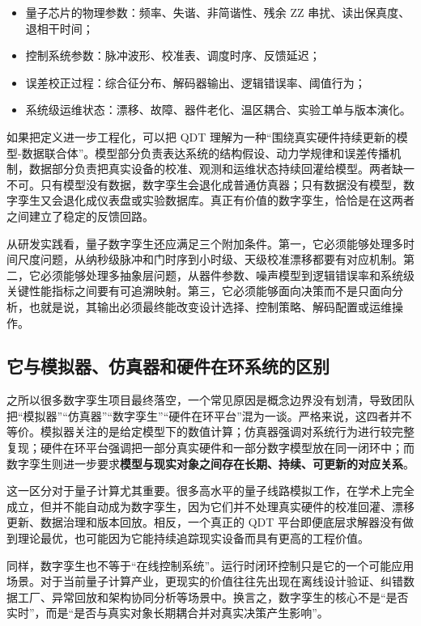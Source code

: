 \documentclass[11pt,a4paper]{article}
\newcommand{\QDT}{QDT}
\begin{document}
\begin{itemize}
  \item 量子芯片的物理参数：频率、失谐、非简谐性、残余 ZZ 串扰、读出保真度、退相干时间；
  \item 控制系统参数：脉冲波形、校准表、调度时序、反馈延迟；
  \item 误差校正过程：综合征分布、解码器输出、逻辑错误率、阈值行为；
  \item 系统级运维状态：漂移、故障、器件老化、温区耦合、实验工单与版本演化。
\end{itemize}

如果把定义进一步工程化，可以把 \QDT{} 理解为一种“围绕真实硬件持续更新的模型-数据联合体”。模型部分负责表达系统的结构假设、动力学规律和误差传播机制，数据部分负责把真实设备的校准、观测和运维状态持续回灌给模型。两者缺一不可。只有模型没有数据，数字孪生会退化成普通仿真器；只有数据没有模型，数字孪生又会退化成仪表盘或实验数据库。真正有价值的数字孪生，恰恰是在这两者之间建立了稳定的反馈回路。

从研发实践看，量子数字孪生还应满足三个附加条件。第一，它必须能够处理多时间尺度问题，从纳秒级脉冲和门时序到小时级、天级校准漂移都要有对应机制。第二，它必须能够处理多抽象层问题，从器件参数、噪声模型到逻辑错误率和系统级关键性能指标之间要有可追溯映射。第三，它必须能够面向决策而不是只面向分析，也就是说，其输出必须最终能改变设计选择、控制策略、解码配置或运维操作。

\subsection{它与模拟器、仿真器和硬件在环系统的区别}

之所以很多数字孪生项目最终落空，一个常见原因是概念边界没有划清，导致团队把“模拟器”“仿真器”“数字孪生”“硬件在环平台”混为一谈。严格来说，这四者并不等价。模拟器关注的是给定模型下的数值计算；仿真器强调对系统行为进行较完整复现；硬件在环平台强调把一部分真实硬件和一部分数字模型放在同一闭环中；而数字孪生则进一步要求\textbf{模型与现实对象之间存在长期、持续、可更新的对应关系}。

这一区分对于量子计算尤其重要。很多高水平的量子线路模拟工作，在学术上完全成立，但并不能自动成为数字孪生，因为它们并不处理真实硬件的校准回灌、漂移更新、数据治理和版本回放。相反，一个真正的 \QDT{} 平台即便底层求解器没有做到理论最优，也可能因为它能持续追踪现实设备而具有更高的工程价值。

同样，数字孪生也不等于“在线控制系统”。运行时闭环控制只是它的一个可能应用场景。对于当前量子计算产业，更现实的价值往往先出现在离线设计验证、纠错数据工厂、异常回放和架构协同分析等场景中。换言之，数字孪生的核心不是“是否实时”，而是“是否与真实对象长期耦合并对真实决策产生影响”。
\end{document}
